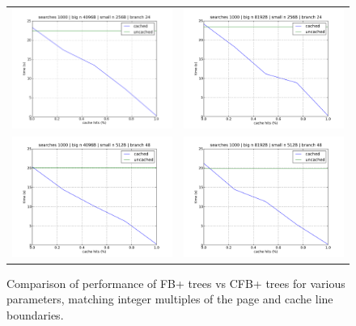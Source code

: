 \documentclass{article}
\begin{document}
\begin{figure}[p]
\begin{tabular}{l l}
\includegraphics[width=250pt]{4096_256_24} & \includegraphics[width=250pt]{8192_256_24} \\
\includegraphics[width=250pt]{4096_512_48} & \includegraphics[width=250pt]{8192_512_48} \\
\end{tabular}
\caption{
Comparison of performance of FB+ trees vs CFB+ trees for various parameters,
matching integer multiples of the page and cache line boundaries.
}
\label{fig:cachehits2}
\end{figure}
\end{document}
